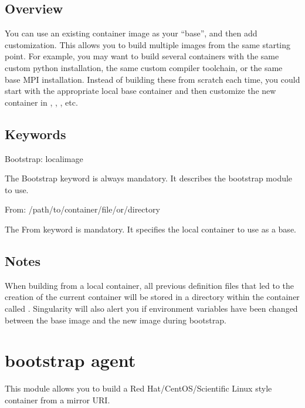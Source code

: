 \documentclass[letterpaper,10pt,english]{sphinxmanual}
\begin{document}
\subsection{Overview}
\label{\detokenize{appendix:id6}}
You can use an existing container image as your “base”, and then add
customization. This allows you to build multiple images from the same starting
point. For example, you may want to build several containers with the same
custom python installation, the same custom compiler toolchain, or the same base
MPI installation. Instead of building these from scratch each time, you could
start with the appropriate local base container and then customize the new
container in , , , etc.


\subsection{Keywords}
\label{\detokenize{appendix:id7}}
%
\begin{sphinxVerbatim}[commandchars=\\\{\}]
Bootstrap: localimage
\end{sphinxVerbatim}

The Bootstrap keyword is always mandatory. It describes the bootstrap module to
use.

%
\begin{sphinxVerbatim}[commandchars=\\\{\}]
From: /path/to/container/file/or/directory
\end{sphinxVerbatim}

The From keyword is mandatory. It specifies the local container to use as a
base.


\subsection{Notes}
\label{\detokenize{appendix:id8}}
When building from a local container, all previous definition files that led to
the creation of the current container will be stored in a directory within the
container called . Singularity will also
alert you if environment variables have been changed between the base image and
the new image during bootstrap.


\section{ bootstrap agent}
\label{\detokenize{appendix:yum-bootstrap-agent}}\label{\detokenize{appendix:build-yum}}\label{\detokenize{appendix:sec-build-yum}}
This module allows you to build a Red Hat/CentOS/Scientific Linux style
container from a mirror URI.
\end{document}
